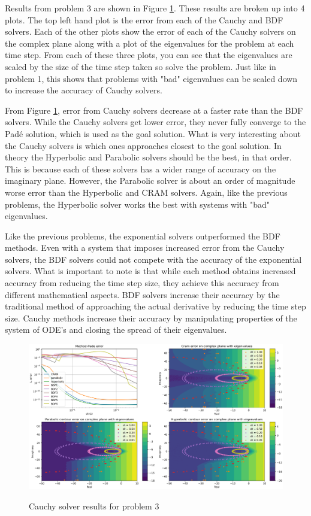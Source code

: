 Results from problem 3 are shown in Figure \ref{fig:problem3results}. These results are broken up into 4 plots. The top left hand plot is the error from each of the Cauchy and BDF solvers. Each of the other plots show the error of each of the Cauchy solvers on the complex plane along with a plot of the eigenvalues for the problem at each time step. From each of these three plots, you can see that the eigenvalues are scaled by the size of the time step taken so solve the problem. Just like in problem 1, this shows that problems with "bad" eigenvalues can be scaled down to increase the accuracy of Cauchy solvers. 

From Figure \ref{fig:problem3results}, error from Cauchy solvers decrease at a faster rate than the BDF solvers. While the Cauchy solvers get lower error, they never fully converge to the Pad\'e solution, which is used as the goal solution. What is very interesting about the Cauchy solvers is which ones approaches closest to the goal solution. In theory the Hyperbolic and Parabolic solvers should be the best, in that order. This is because each of these solvers has a wider range of accuracy on the imaginary plane. However, the Parabolic solver is about an order of magnitude worse error than the Hyperbolic and CRAM solvers. Again, like the previous problems, the Hyperbolic solver works the best with systems with "bad" eigenvalues. 

Like the previous problems, the exponential solvers outperformed the BDF methods. Even with a system that imposes increased error from the Cauchy solvers, the BDF solvers could not compete with the accuracy of the exponential solvers. What is important to note is that while each method obtains increased accuracy from reducing the time step size, they achieve this accuracy from different mathematical aspects. BDF solvers increase their accuracy by the traditional method of approaching the actual derivative by reducing the time step size. Cauchy methods increase their accuracy by manipulating properties of the system of ODE's and closing the spread of their eigenvalues. 


\FloatBarrier

\begin{figure}
  \centering
  \includegraphics[width=9in]{images/problem3results.png}\\
  \caption{Cauchy solver results for problem 3}
  \label{fig:problem3results}
\end{figure} 
